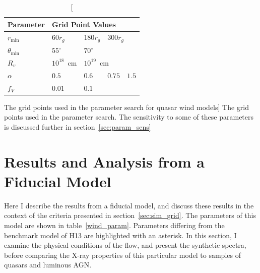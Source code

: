 \begin{table}
\centering
\begin{tabular}{p{2cm}p{1cm}p{1cm}p{1cm}p{1cm}}
Parameter & \multicolumn{4}{l}{Grid Point Values}  \\
\hline \hline 
$r_{\mathrm{min}}$ 	&	 $60r_{g}$ & $180r_{g}$ & \multicolumn{2}{l}{$300r_{g}$} \\ 
$\theta_{\mathrm{min}}$ 	& $55^{\circ}$ & \multicolumn{3}{l}{$70^{\circ}$} \\ 
$R_v$  	        &	 $10^{18}$~cm & \multicolumn{3}{l}{$10^{19}$~cm} \\ 
$\alpha$ 	&	 $0.5$ & $0.6$ & $0.75$ & $1.5$ \\
$f_V$ 	&	 $0.01$ & \multicolumn{3}{l}{$0.1$}  \\
\hline 
\end{tabular}
\caption
[The grid points used in the parameter search for quasar wind models]
{The grid points used in the parameter search.
The sensitivity to some of these parameters is discussed 
further in section~\ref{sec:param_sens}}
\label{grid_table}
\end{table}







\section{Results and Analysis from a Fiducial Model}
\label{sec:qso_results}
Here I describe the results from a fiducial model,
and discuss these results in the context of the criteria 
presented in section~\ref{sec:sim_grid}. 
The parameters of this model are shown in table~\ref{wind_param}.
Parameters differing from the benchmark model of H13 are 
highlighted with an asterisk. In this section, I examine the physical 
conditions of the flow, and present the synthetic spectra, before comparing
the X-ray properties of this particular model to samples of
quasars and luminous AGN. 

